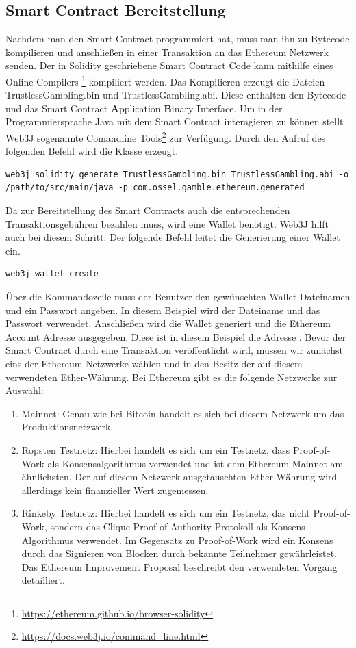 \subsection{Smart Contract Bereitstellung}
Nachdem man den Smart Contract programmiert hat, muss man ihn zu Bytecode kompilieren und anschließen in einer Transaktion an das Ethereum Netzwerk senden. Der in Solidity geschriebene Smart Contract Code kann mithilfe eines Online Compilers \footnote{\url{https://ethereum.github.io/browser-solidity}} kompiliert werden. Das Kompilieren erzeugt die Dateien {TrustlessGambling.bin} und {TrustlessGambling.abi}. Diese enthalten den Bytecode und das Smart Contract \textbf{A}pplication \textbf{B}inary \textbf{I}nterface.
Um in der Programmiersprache Java mit dem Smart Contract interagieren zu können stellt Web3J sogenannte Comandline Tools\footnote{\url{https://docs.web3j.io/command_line.html}} zur Verfügung. Durch den Aufruf des folgenden Befehl wird die Klasse  erzeugt. 
\begin{lstlisting}[basicstyle=\small]
web3j solidity generate TrustlessGambling.bin TrustlessGambling.abi -o /path/to/src/main/java -p com.ossel.gamble.ethereum.generated
\end{lstlisting}
Da zur Bereitstellung des Smart Contracts auch die entsprechenden Transaktionsgebühren bezahlen muss, wird eine Wallet benötigt. Web3J hilft auch bei diesem Schritt. Der folgende Befehl leitet die Generierung einer Wallet ein.
\begin{lstlisting}[basicstyle=\small]
web3j wallet create
\end{lstlisting}
Über die Kommandozeile muss der Benutzer den gewünschten Wallet-Dateinamen  und ein Passwort angeben. In diesem Beispiel wird der Dateiname  und das Passwort  verwendet. Anschließen wird die Wallet generiert und die Ethereum Account Adresse ausgegeben. Diese ist in diesem Beispiel die Adresse  .
Bevor der Smart Contract durch eine Transaktion veröffentlicht wird, müssen wir zunächst eins der Ethereum Netzwerke wählen und in den Besitz der auf diesem verwendeten Ether-Währung. 
Bei Ethereum gibt es die folgende Netzwerke zur Auswahl:
\begin{enumerate}
\item Mainnet: Genau wie bei Bitcoin handelt es sich bei diesem Netzwerk um das Produktionsnetzwerk. 
\item Ropsten Testnetz: Hierbei handelt es sich um ein Testnetz, dass Proof-of-Work als Konsensalgorithmus verwendet und ist dem Ethereum Mainnet am ähnlichsten. Der auf diesem Netzwerk ausgetauschten Ether-Währung wird allerdings kein finanzieller Wert zugemessen.
\item Rinkeby Testnetz: Hierbei handelt es sich um ein Testnetz, das nicht Proof-of-Work, sondern das Clique-Proof-of-Authority Protokoll als Konsens-Algorithmus verwendet. Im Gegensatz zu Proof-of-Work wird ein Konsens durch das Signieren von Blocken durch bekannte Teilnehmer gewährleistet. Das Ethereum Improvement Proposal \cite{eip_rinkeby} beschreibt den verwendeten Vorgang detailliert.
\end{enumerate}
